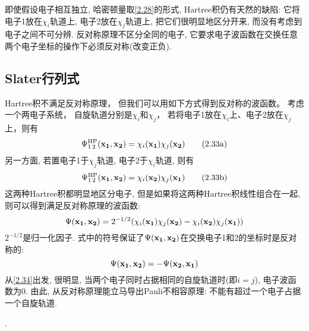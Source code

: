 即使假设电子相互独立, 
哈密顿量取\ref{2.28}的形式, 
Hartree积仍有天然的缺陷: 它将电子1放在$\chi_i$轨道上, 
电子2放在$\chi_j$轨道上, 
把它们很明显地区分开来, 
而没有考虑到电子之间不可分辨. 
反对称原理不区分全同的电子, 
它要求电子波函数在交换任意两个电子坐标的操作下必须反对称(改变正负).

\subsection{Slater行列式}
 \label{sec2.2.3}
Hartree积不满足反对称原理，
但我们可以用如下方式得到反对称的波函数。
考虑一个两电子系统，
自旋轨道分别是$\chi_i$和$\chi_j$，
若将电子1放在$\chi_i$上、电子2放在$\chi_j$上，则有
\begin{equation}
\begin{subequations}
\Psi^{\rm HP}_{1\,2}(\bo{x_1,x_2})=\chi_i(\bo{x_1})\chi_j(\bo{x_2})\tag{2.33a}
\end{subequations}
\end{equation}
\label{2.33a}
另一方面, 
若置电子1于$\chi_j$轨道, 
电子2于$\chi_i$轨道, 
则有
\begin{equation*}
\addtocounter{equation}{-1}
\Psi^{\rm HP}_{1\,2}(\bo{x_1,x_2})=\chi_i(\bo{x_2})\chi_j(\bo{x_1})\tag{2.33b}
\end{equation*}
\label{2.33b}
这两种Hartree积都明显地区分电子, 
但是如果将这两种Hartree积线性组合在一起, 
则可以得到满足反对称原理的波函数:
\begin{equation}
\label{2.34}
\Psi(\mathbf{x_1,x_2})=2^{-1/2}(\chi_i(\mathbf{x_1})\chi_j(\mathbf{x_2})-\chi_i(\mathbf{x_2})\chi_j(\mathbf{x_1}))
\end{equation}
$2^{-1/2}$是归一化因子. 式中的符号保证了$\Psi(\mathbf{x_1,x_2})$在交换电子1和2的坐标时是反对称的:
\begin{equation}
\Psi(\mathbf{x_1,x_2})=-\Psi(\mathbf{x_2,x_1})
\end{equation}
从\ref{2.34}出发, 
很明显, 
当两个电子同时占据相同的自旋轨道时(即$i=j$), 
电子波函数为0. 
由此, 
从反对称原理能立马导出Pauli不相容原理: 不能有超过一个电子占据一个自旋轨道.


.


